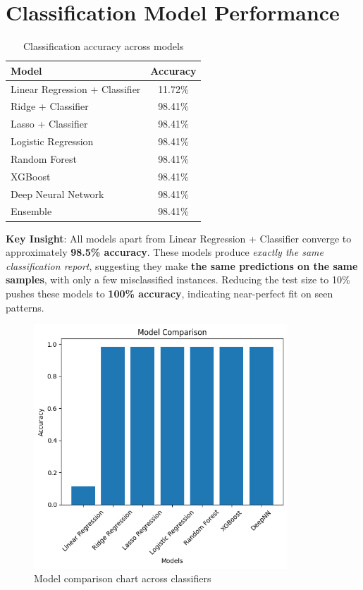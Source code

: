 \documentclass{article}
\begin{document}
\section{Classification Model Performance}
\begin{table}[H]
\centering
\begin{tabular}{lc}
\toprule
\textbf{Model} & \textbf{Accuracy} \\
\midrule
Linear Regression + Classifier & 11.72\% \\
Ridge + Classifier & 98.41\% \\
Lasso + Classifier & 98.41\% \\
Logistic Regression & 98.41\% \\
Random Forest & 98.41\% \\
XGBoost & 98.41\% \\
Deep Neural Network & 98.41\% \\
Ensemble & 98.41\% \\
\bottomrule
\end{tabular}
\caption{Classification accuracy across models}
\end{table}

\textbf{Key Insight}: All models apart from Linear Regression + Classifier converge to approximately \textbf{98.5\% accuracy}. These models produce \textit{exactly the same classification report}, suggesting they make \textbf{the same predictions on the same samples}, with only a few misclassified instances. Reducing the test size to 10\% pushes these models to \textbf{100\% accuracy}, indicating near-perfect fit on seen patterns.

\begin{figure}[H]
\centering
\includegraphics[width=0.85\textwidth]{model_comparison.png}
\caption{Model comparison chart across classifiers}
\end{figure}
\end{document}
